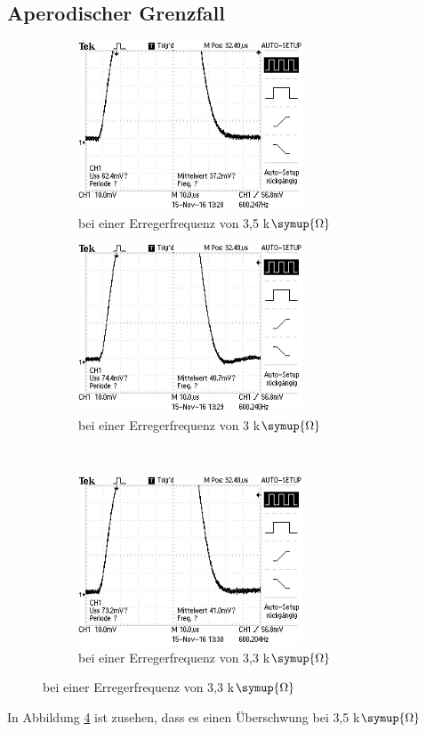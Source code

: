   \subsection{Aperodischer Grenzfall}
  \begin{figure}
    \centering
    \caption{Spannungen im Schwingkreis}
    \begin{subfigure}{0.48\textwidth}
      \includegraphics[height= 5cm]{./logos/5Print.JPG}
      \caption{bei einer Erregerfrequenz von 3,5 k$\symup{\Omega}$}
      \label{fig:p1}
    \end{subfigure}
    \begin{subfigure}{0.48\textwidth}
      \includegraphics[height= 5cm]{./logos/6Print.JPG}
      \caption{bei einer Erregerfrequenz von 3 k$\symup{\Omega}$}
      \label{fig:p2}
    \end{subfigure}
    \\
    \begin{subfigure}{0.48\textwidth}
      \includegraphics[height= 5cm]{./logos/7Print.JPG}
      \caption{bei einer Erregerfrequenz von 3,3 k$\symup{\Omega}$}
      \label{fig:p3}
    \end{subfigure}
      \label{fig:prints}
  \end{figure}
  \FloatBarrier
  In Abbildung \ref{fig:prints} ist zusehen, dass es einen Überschwung
  bei 3,5 k$\symup{\Omega}$

